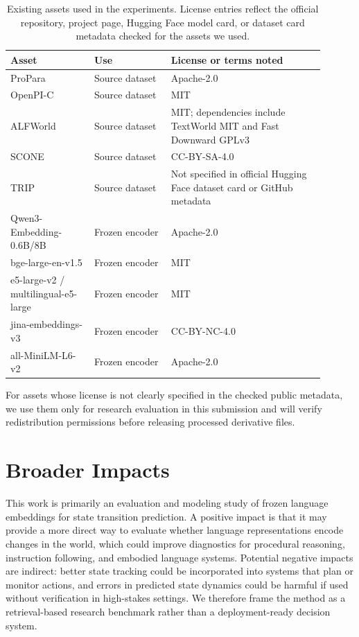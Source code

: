 \documentclass{article}
\begin{document}
\begin{table}[h]
  \centering
  \caption{Existing assets used in the experiments. License entries reflect the official repository, project page, Hugging Face model card, or dataset card metadata checked for the assets we used.}
  \label{tab:asset-licenses}
  \footnotesize
  \setlength{\tabcolsep}{3pt}
  \begin{tabular}{p{0.24\linewidth}p{0.22\linewidth}p{0.44\linewidth}}
    \toprule
    Asset & Use & License or terms noted \\
    \midrule
    ProPara & Source dataset & Apache-2.0 \\
    OpenPI-C & Source dataset & MIT \\
    ALFWorld & Source dataset & MIT; dependencies include TextWorld MIT and Fast Downward GPLv3 \\
    SCONE & Source dataset & CC-BY-SA-4.0 \\
    TRIP & Source dataset & Not specified in official Hugging Face dataset card or GitHub metadata \\
    Qwen3-Embedding-0.6B/8B & Frozen encoder & Apache-2.0 \\
    bge-large-en-v1.5 & Frozen encoder & MIT \\
    e5-large-v2 / multilingual-e5-large & Frozen encoder & MIT \\
    jina-embeddings-v3 & Frozen encoder & CC-BY-NC-4.0 \\
    all-MiniLM-L6-v2 & Frozen encoder & Apache-2.0 \\
    \bottomrule
  \end{tabular}
\end{table}

For assets whose license is not clearly specified in the checked public metadata, we use them only for research evaluation in this submission and will verify redistribution permissions before releasing processed derivative files.

\section{Broader Impacts}

This work is primarily an evaluation and modeling study of frozen language embeddings for state transition prediction. A positive impact is that it may provide a more direct way to evaluate whether language representations encode changes in the world, which could improve diagnostics for procedural reasoning, instruction following, and embodied language systems. Potential negative impacts are indirect: better state tracking could be incorporated into systems that plan or monitor actions, and errors in predicted state dynamics could be harmful if used without verification in high-stakes settings. We therefore frame the method as a retrieval-based research benchmark rather than a deployment-ready decision system.


\end{document}
